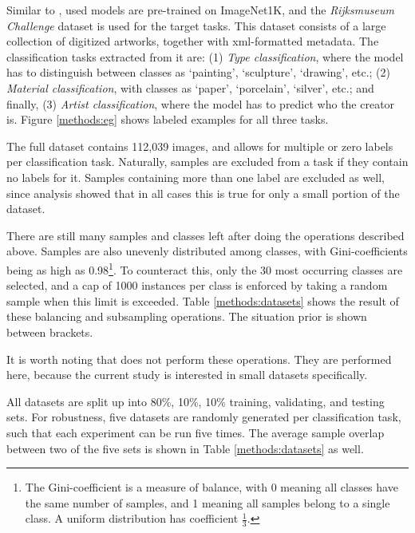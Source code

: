 Similar to \citeauthor{sabatelli2018deep}, used models are pre-trained on ImageNet1K, and the \textit{Rijksmuseum Challenge} dataset \citep{mensink14icmr} is used for the target tasks. This dataset consists of a large collection of digitized artworks, together with xml-formatted metadata. The classification tasks extracted from it are: (1) \textit{Type classification}, where the model has to distinguish between classes as `painting', `sculpture', `drawing', etc.; (2) \textit{Material classification}, with classes as `paper', `porcelain', `silver', etc.; and finally, (3) \textit{Artist classification}, where the model has to predict who the creator is. Figure \ref{methods:eg} shows labeled examples for all three tasks.

The full dataset contains 112,039 images, and allows for multiple or zero labels per classification task. Naturally, samples are excluded from a task if they contain no labels for it. Samples containing more than one label are excluded as well, since analysis showed that in all cases this is true for only a small portion of the dataset.%

There are still many samples and classes left after doing the operations described above. Samples are also unevenly distributed among classes, with Gini-coefficients being as high as 0.98\footnote{The Gini-coefficient is a measure of balance, with 0 meaning all classes have the same number of samples, and 1 meaning all samples belong to a single class. A uniform distribution has coefficient $\frac{1}{3}$.}. To counteract this, only the 30 most occurring classes are selected, and a cap of 1000 instances per class is enforced by taking a random sample when this limit is exceeded. Table \ref{methods:datasets} shows the result of these balancing and subsampling operations. The situation prior is shown between brackets.

It is worth noting that \citeauthor{sabatelli2018deep} does not perform these operations. They are performed here, because the current study is interested in small datasets specifically.

All datasets are split up into 80\%, 10\%, 10\% training, validating, and testing sets. For robustness, five datasets are randomly generated per classification task, such that each experiment can be run five times. The average sample overlap between two of the five sets is shown in Table \ref{methods:datasets} as well.

